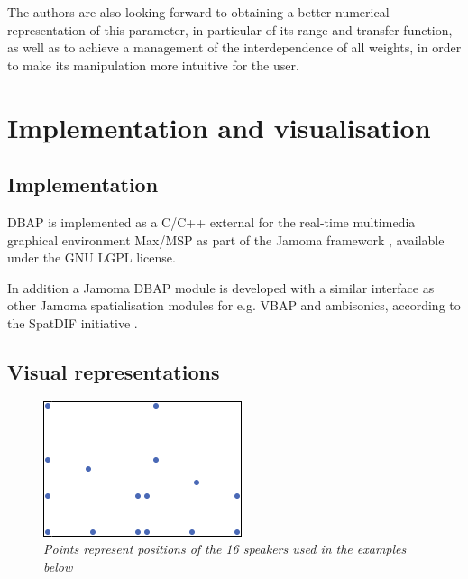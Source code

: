 \documentclass[twoside,10pt]{article}
\begin{document}
The authors are also looking forward to obtaining a better numerical representation of this parameter, in particular of its range and transfer function, as well as to achieve a management of the interdependence of all weights, in order to make its manipulation more intuitive for the user.




%
%

\section{Implementation and visualisation}

\subsection{Implementation}

DBAP is implemented as a C/C++ external for the real-time multimedia graphical environment Max/MSP \cite{Puckette:1988patcher, Zicarelli:1998} as part of the Jamoma framework \cite{Place:2006jamoma}, available under the GNU LGPL license.

In addition a Jamoma DBAP module is developed with a similar interface as other Jamoma spatialisation modules for e.g. VBAP and ambisonics, according to the SpatDIF initiative \cite{Peters:2008spatdif}.



\subsection{Visual representations}
\label{sec:visual_representation}

\begin{figure}[ht]
\centerline{\includegraphics[scale=0.8]{LoudspeakerPositions}}
\caption{{\it Points represent positions of the 16 speakers used in the examples below}}
\label{speaker_positions}
\end{figure}
\end{document}
